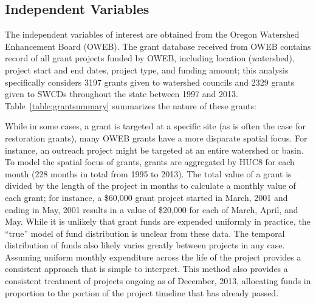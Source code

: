 \documentclass[12pt,a4paper,titlepage]{article}
\begin{document}
\subsection*{Independent Variables}

The independent variables of interest are obtained from the Oregon Watershed Enhancement Board (OWEB). The grant database received from OWEB contains record of all grant projects funded by OWEB, including location (watershed), project start and end dates, project type, and funding amount; this analysis specifically considers 3197 grants given to watershed councils and 2329 grants given to SWCDs throughout the state between 1997 and 2013. Table~\ref{table:grantsummary} summarizes the nature of these grants:



While in some cases, a grant is targeted at a specific site (as is often the case for restoration grants), many OWEB grants have a more disparate spatial focus. For instance, an outreach project might be targeted at an entire watershed or basin. To model the spatial focus of grants, grants are aggregated by HUC8 for each month (228 months in total from 1995 to 2013). The total value of a grant is divided by the length of the project in months to calculate a monthly value of each grant; for instance, a \$60,000 grant project started in March, 2001 and ending in May, 2001 results in a value of \$20,000 for each of March, April, and May. While it is unlikely that grant funds are expended uniformly in practice, the “true” model of fund distribution is unclear from these data. The temporal distribution of funds also likely varies greatly between projects in any case. Assuming uniform monthly expenditure across the life of the project provides a consistent approach that is simple to interpret. This method also provides a consistent treatment of projects ongoing as of December, 2013, allocating funds in proportion to the portion of the project timeline that has already passed.
\end{document}
